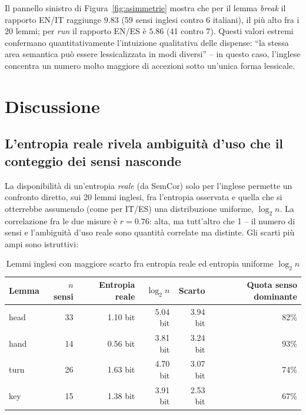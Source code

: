 \documentclass[12pt,a4paper]{article}
\begin{document}
Il pannello sinistro di Figura~\ref{fig:asimmetrie} mostra che per il lemma \textit{break} il rapporto EN/IT raggiunge $9.83$ (59 sensi inglesi contro 6 italiani), il pi\`u alto fra i 20 lemmi; per \textit{run} il rapporto EN/ES \`e $5.86$ (41 contro 7). Questi valori estremi confermano quantitativamente l'intuizione qualitativa delle dispense: ``la stessa area semantica pu\`o essere lessicalizzata in modi diversi'' -- in questo caso, l'inglese concentra un numero molto maggiore di accezioni sotto un'unica forma lessicale.

\section{Discussione}
\label{sec:discussione}

\subsection{L'entropia reale rivela ambiguit\`a d'uso che il conteggio dei sensi nasconde}
\label{sec:entropia-vs-log2n}

La disponibilit\`a di un'entropia \emph{reale} (da SemCor) solo per l'inglese permette un confronto diretto, sui 20 lemmi inglesi, fra l'entropia osservata e quella che si otterrebbe assumendo (come per IT/ES) una distribuzione uniforme, $\log_2 n$. La correlazione fra le due misure \`e $r=0.76$: alta, ma tutt'altro che 1 -- il numero di sensi e l'ambiguit\`a d'uso reale sono quantit\`a correlate ma distinte. Gli scarti pi\`u ampi sono istruttivi:

\begin{table}[H]
  \centering
  \caption{Lemmi inglesi con maggiore scarto fra entropia reale ed entropia uniforme $\log_2 n$}
  \begin{tabular}{lrrrrr}
    \toprule
    \textbf{Lemma} & \textbf{$n$ sensi} & \textbf{Entropia reale} & \textbf{$\log_2 n$} & \textbf{Scarto} & \textbf{Quota senso dominante} \\
    \midrule
    head & 33 & 1.10 bit & 5.04 bit & 3.94 bit & 82\% \\
    hand & 14 & 0.56 bit & 3.81 bit & 3.24 bit & 93\% \\
    turn & 26 & 1.63 bit & 4.70 bit & 3.07 bit & 74\% \\
    key  & 15 & 1.38 bit & 3.91 bit & 2.53 bit & 67\% \\
    \bottomrule
  \end{tabular}
\end{table}
\end{document}
